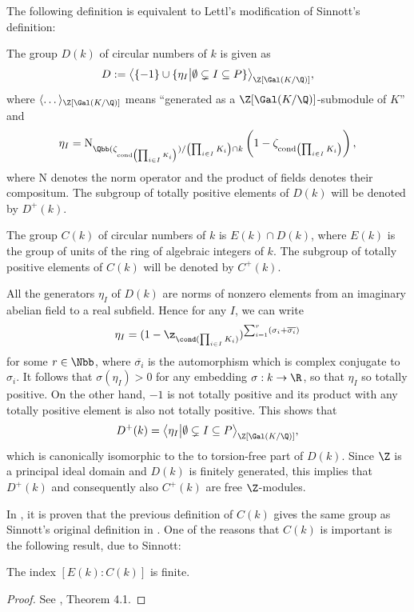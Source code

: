 The following definition is equivalent to Lettl's modification of Sinnott's definition:
\begin{definition}
The group $D(k)$ of circular numbers of $k$ is given as
$$D:=\big\langle \{-1\} \cup \{\eta_I \big\vert \emptyset \subsetneq I \subseteq P \}\big\rangle_{\Z[\Gal(K/\Q)]},$$
where $\langle \dots \rangle_{\Z[\Gal(K/\Q)]}$ means \enquote{generated as a $\Z[\Gal(K/\Q)]$-submodule of $K$} and $$\eta_I=\text{N}_{\Qbb(\zeta_{\text{cond} \left(\prod_{i\in I}K_i\right)})/\left(\prod_{i\in I}K_i\right)\cap k}\left(1-\zeta_{\text{cond} \left(\prod_{i\in I}K_i\right)}\right),$$ where $\text{N}$ denotes the norm operator and the product of fields denotes their compositum. The subgroup of totally positive elements of $D(k)$ will be denoted by $D^+(k)$.
\end{definition}

\begin{definition}
The group $C(k)$ of circular numbers of $k$ is $E(k)\cap D(k)$, where $E(k)$ is the group of units of the ring of algebraic integers of $k$. The subgroup of totally positive elements of $C(k)$ will be denoted by $C^+(k)$.
\end{definition}

\begin{rem}
All the generators $\eta_I$ of $D(k)$ are norms of nonzero elements from an imaginary abelian field to a real subfield. Hence for any $I$, we can write 
$$\eta_I=(1-\z_{\cond(\prod_{i\in I}K_i)})^{\sum_{i=1}^r(\sigma_i+\overline{\sigma_i})}$$
for some $r\in\Nbb$, where $\overline{\sigma_i}$ is the automorphism which is complex conjugate to $\sigma_i$. It follows that $\sigma(\eta_I)>0$ for any embedding $\sigma:k\to \R$, so that $\eta_I$ so totally positive. On the other hand, $-1$ is not totally positive and its product with any totally positive element is also not totally positive. This shows that $$D^+(k)=\big\langle  \eta_I \big\vert \emptyset \subsetneq I \subseteq P\big\rangle_{\Z[\Gal(K/\Q)]},$$
which is canonically isomorphic to the to torsion-free part of $D(k)$. Since $\Z$ is a principal ideal domain and $D(k)$ is finitely generated, this implies that $D^+(k)$ and consequently also $C^+(k)$ are free $\Z$-modules.
\end{rem}

In \citep{Lettl1990}, it is proven that the previous definition of $C(k)$ gives the same group as Sinnott's original definition in \citep{SinnottAb}. One of the reasons that $C(k)$ is important is the following result, due to Sinnott:
\begin{theorem}\label{finind}
The index $[E(k):C(k)]$ is finite.
\end{theorem}
\begin{proof}
See \citep{SinnottAb}, Theorem 4.1.
\end{proof}

